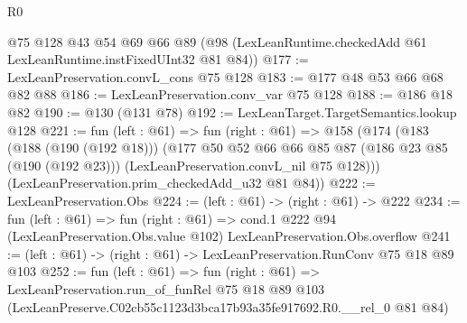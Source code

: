 \begin{lexlean}{R0}
\begin{coremodule}
    @75
    @128
    @43
    @54
    @69
    @66
    @89
    (@98 (LexLeanRuntime.checkedAdd @61 LexLeanRuntime.instFixedUInt32 @81 @84))
@177 := LexLeanPreservation.convL_cons @75 @128
@183 := @177 @48 @53 @66 @68 @82 @88
@186 := LexLeanPreservation.conv_var @75 @128
@188 := @186 @18 @82
@190 := @130 (@131 @78)
@192 := LexLeanTarget.TargetSemantics.lookup @128
@221 := fun (left : @61) =>
  fun (right : @61) =>
  @158
    (@174
      (@183
        (@188 (@190 (@192 @18)))
        (@177
          @50
          @52
          @66
          @66
          @85
          @87
          (@186 @23 @85 (@190 (@192 @23)))
          (LexLeanPreservation.convL_nil @75 @128)))
      (LexLeanPreservation.prim_checkedAdd_u32 @81 @84))
@222 := LexLeanPreservation.Obs
@224 := (left : @61) -> (right : @61) -> @222
@234 := fun (left : @61) =>
  fun (right : @61) =>
  cond.{1} @222 @94 (LexLeanPreservation.Obs.value @102) LexLeanPreservation.Obs.overflow
@241 := (left : @61) -> (right : @61) -> LexLeanPreservation.RunConv @75 @18 @89 @103
@252 := fun (left : @61) =>
  fun (right : @61) =>
  LexLeanPreservation.run_of_funRel
    @75
    @18
    @89
    @103
    (LexLeanPreserve.C02cb55c1123d3bca17b93a35fe917692.R0.__rel_0 @81 @84)
\end{coremodule}
\end{lexlean}
